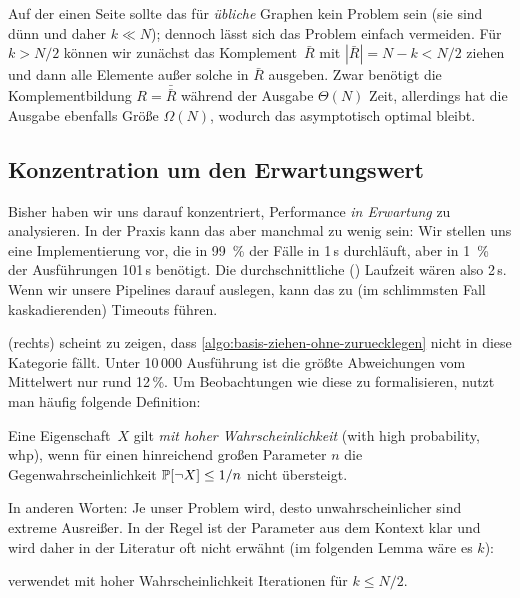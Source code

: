 Auf  der einen Seite sollte das für \emph{übliche} Graphen kein Problem sein (sie sind dünn und daher $k \ll N$); dennoch lässt sich das Problem einfach vermeiden.
Für $k > N / 2$ können wir zunächst das Komplement~$\bar R$ mit  $| \bar R | = N - k < N/2$ ziehen und dann alle Elemente außer solche in $\bar R$ ausgeben.
Zwar benötigt die Komplementbildung $R = \bar{\bar R}$ während der Ausgabe $\Theta(N)$ Zeit, allerdings hat die Ausgabe ebenfalls Größe $\Omega(N)$, wodurch das asymptotisch optimal bleibt.

\subsection{Konzentration um den Erwartungswert}
Bisher haben wir uns darauf konzentriert, Performance \emph{in Erwartung} zu analysieren.
In der Praxis kann das aber manchmal zu wenig sein:
Wir stellen uns eine Implementierung vor, die in 99~\% der Fälle in 1\,s durchläuft, aber in 1~\% der Ausführungen 101\,s benötigt.
Die durchschnittliche () Laufzeit wären also 2\,s.
Wenn wir unsere Pipelines darauf auslegen, kann das zu (im schlimmsten Fall kaskadierenden) Timeouts führen.

 (rechts) scheint zu zeigen, dass \cref{algo:basis-ziehen-ohne-zuruecklegen} nicht in diese Kategorie fällt.
Unter 10\,000 Ausführung ist die größte Abweichungen vom Mittelwert nur rund 12\,\%.
Um Beobachtungen wie diese zu formalisieren, nutzt man häufig folgende Definition:

\begin{definition}
    Eine  Eigenschaft~$X$ gilt \emph{mit hoher Wahrscheinlichkeit} (with high probability, whp),
    wenn für einen hinreichend großen Parameter $n$ die Gegenwahrscheinlichkeit $\mathbb{P}\!\left[\lnot X\right] \le 1/n$ nicht übersteigt.
\end{definition}

In anderen Worten: Je  unser Problem wird, desto unwahrscheinlicher sind extreme Ausreißer.
In der Regel ist der Parameter aus dem Kontext klar und wird daher in der Literatur oft nicht erwähnt (im folgenden Lemma wäre es $k$):

\begin{lemma}
     verwendet mit hoher Wahrscheinlichkeit  Iterationen für $k \le N/2$.
\end{lemma}

